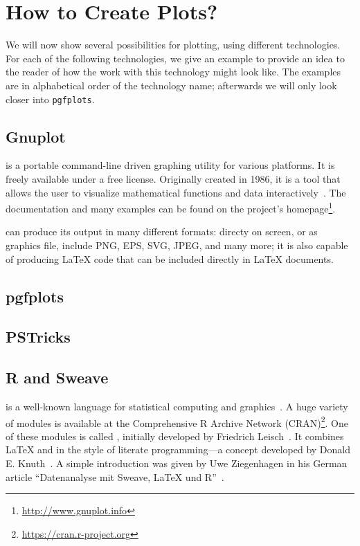 \section{How to Create Plots?}

We will now show several possibilities for plotting, using different
technologies. For each of the following technologies, we give an example to
provide an idea to the reader of how the work with this technology might look
like. The examples are in alphabetical order of the technology name; afterwards
we will only look closer into \texttt{pgfplots}.

\subsection{Gnuplot}

 is a portable command-line driven graphing utility for
various platforms.  It is freely available under a free license.  Originally
created in 1986, it is a tool that allows the user to visualize mathematical
functions and data interactively~\cite{WilliamsKelley2016}.  The documentation
and many examples can be found on the project's
homepage\footnote{\href{http://www.gnuplot.info}{http://www.gnuplot.info}}.

 can produce its output in many different formats: directy on
screen, or as graphics file, include PNG, EPS, SVG, JPEG, and many more; it is
also capable of producing \LaTeX{} code that can be included directly in
\LaTeX{} documents.

\subsection{pgfplots}

\subsection{PSTricks}

\subsection{R and Sweave}

 is a well-known language for statistical computing and
graphics~\cite{Ihaka1998}.  A huge variety of modules is available at the
Comprehensive R Archive Network (CRAN)\footnote{%
  \href{https://cran.r-project.org}{https://cran.r-project.org}}.  One of these
modules is called , initially developed by Friedrich
Leisch~\cite{Leisch2002}.  It combines \LaTeX{} and  in the style of
literate programming—a concept developed by Donald E\@. Knuth~\cite{Knuth1992}.
A simple introduction was given by Uwe Ziegenhagen in his German article
\enquote{Datenanalyse mit Sweave, \LaTeX{} und R}~\cite{Ziegenhagen2010}.

